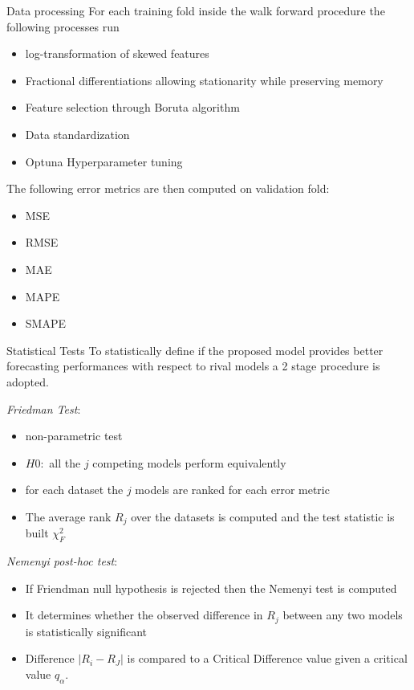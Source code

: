 \begin{frame}{Data processing}
For each training fold inside the walk forward procedure the following processes run

    \begin{itemize}
        \item log-transformation of skewed features
        \item Fractional differentiations allowing stationarity while preserving memory
        \item Feature selection through Boruta algorithm
        \item Data standardization 
        \item Optuna Hyperparameter tuning
    \end{itemize} 

The following error metrics are then computed on validation fold:
\begin{itemize}
    \item MSE
    \item RMSE
    \item MAE
    \item MAPE
    \item SMAPE
\end{itemize}

    
\end{frame}


\begin{frame}{Statistical Tests}
    To statistically define if the proposed model provides better forecasting performances with respect to 
rival models a 2 stage procedure is adopted.\\

\vspace{5mm}

\textit{Friedman Test}:
\begin{itemize}
    \item non-parametric test 
    \item $H0:$ all the $j$ competing models perform equivalently
    \item for each dataset the $j$ models are ranked for each error metric
    \item The average rank $R_j$ over the datasets is computed and the test statistic is built $\chi_F^{2}$ 
\end{itemize}


\textit{Nemenyi post-hoc test}:
\begin{itemize}
    \item If Friendman null hypothesis is rejected then the Nemenyi test is computed
    \item It determines whether the observed difference in $R_j$ between any two models is statistically significant
    \item Difference $|R_i -R_J|$ is compared to a Critical Difference value given a critical value $q_\alpha$.
\end{itemize}




\end{frame}
